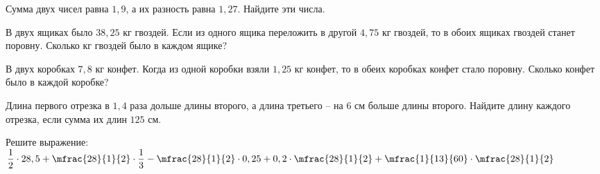 \begin{class}[number=5]
\begin{listofex}
		\item Сумма двух чисел равна \(1,9\), а их разность равна \(1,27\). Найдите эти числа.
		\item В двух ящиках было \(38,25\) кг гвоздей. Если из одного ящика переложить в другой \(4,75\) кг гвоздей, то в обоих ящиках гвоздей станет поровну. Сколько кг гвоздей было в каждом ящике?
		\item В двух коробках \(7,8\) кг конфет. Когда из одной коробки взяли \(1,25\) кг конфет, то в обеих коробках конфет стало поровну. Сколько конфет было в каждой коробке?
		\item Длина первого отрезка в \(1,4\) раза дольше длины второго, а длина третьего – на \(6\) см больше длины второго. Найдите длину каждого отрезка, если сумма их длин \(125\) см.
		\item Решите выражение: \(\dfrac{1}{2} \cdot 28,5 + \mfrac{28}{1}{2} \cdot \dfrac{1}{3} - \mfrac{28}{1}{2} \cdot 0,25 + 0,2 \cdot \mfrac{28}{1}{2} + \mfrac{1}{13}{60} \cdot \mfrac{28}{1}{2}\)
	\end{listofex}
\end{class}
%
%
